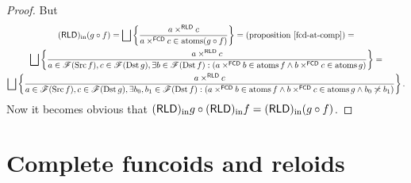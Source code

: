 \begin{proof}
But 
\begin{multline*}
\torldin(g\circ f)=
\bigsqcup\setcond{a\times^{\mathsf{RLD}}c}{a\times^{\mathsf{FCD}}c\in\atoms(g\circ f)}=\text{(proposition~\ref{fcd-at-comp})}=\\
\bigsqcup\setcond{a\times^{\mathsf{RLD}}c}{a\in\mathscr{F}(\Src f),c\in\mathscr{F}(\Dst g),\exists b\in\mathscr{F}(\Dst f):(a\times^{\mathsf{FCD}}b\in\atoms f\land b\times^{\mathsf{FCD}}c\in\atoms g)}=\\
\bigsqcup\setcond{a\times^{\mathsf{RLD}}c}{a\in\mathscr{F}(\Src f),c\in\mathscr{F}(\Dst g),\exists b_0,b_1\in\mathscr{F}(\Dst f):(a\times^{\mathsf{FCD}}b\in\atoms f\land b\times^{\mathsf{FCD}}c\in\atoms g\land b_0\nasymp b_1)}.
\end{multline*}
Now it becomes obvious that $(\mathsf{RLD})_{\mathrm{in}} g\circ(\mathsf{RLD})_{\mathrm{in}} f=(\mathsf{RLD})_{\mathrm{in}}(g\circ f)$.
\end{proof}

\section{Complete funcoids and reloids}

